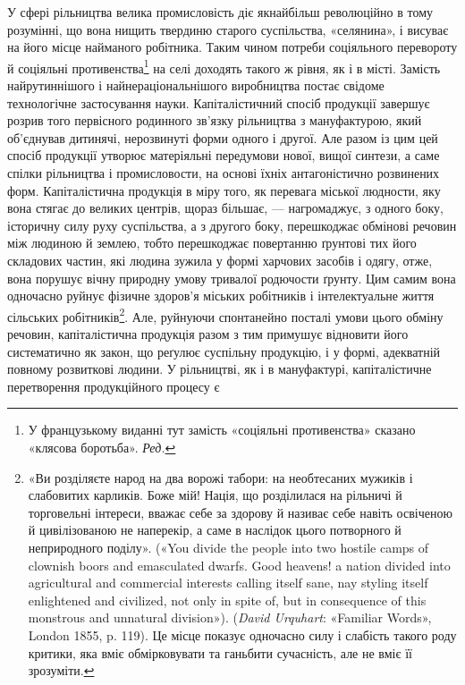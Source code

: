 У сфері рільництва велика промисловість діє якнайбільш
революційно в тому розумінні, що вона нищить твердиню старого
суспільства, «селянина», і висуває на його місце найманого робітника.
Таким чином потреби соціяльного перевороту й соціяльні
противенства\footnote*{
У французькому виданні тут замість «соціяльні противенства»
сказано «клясова боротьба». \emph{Ред.}
} на селі доходять такого ж рівня, як і в місті.
Замість найрутиннішого і найнераціональнішого виробництва
постає свідоме технологічне застосування науки. Капіталістичний
спосіб продукції завершує розрив того первісного родинного
зв’язку рільництва з мануфактурою, який об’єднував дитинячі,
нерозвинуті форми одного і другої. Але разом із цим цей спосіб
продукції утворює матеріяльні передумови нової, вищої
синтези, а саме спілки рільництва і промисловости, на основі
їхніх антагоністично розвинених форм. Капіталістична продукція
в міру того, як перевага міської людности, яку вона стягає до
великих центрів, щораз більшає, — нагромаджує, з одного боку,
історичну силу руху суспільства, а з другого боку, перешкоджає
обмінові речовин між людиною й землею, тобто перешкоджає
повертанню ґрунтові тих його складових частин, які людина
зужила у формі харчових засобів і одягу, отже, вона порушує
вічну природну умову тривалої родючости ґрунту. Цим самим
вона одночасно руйнує фізичне здоров’я міських робітників і
інтелектуальне життя сільських робітників\footnote{
«Ви розділяєте народ на два ворожі табори: на необтесаних мужиків
і слабовитих карликів. Боже мій! Нація, що розділилася на рільничі
й торговельні інтереси, вважає себе за здорову й називає себе
навіть освіченою й цивілізованою не наперекір, а саме в наслідок цього
потворного й неприродного поділу». («You divide the people into two
hostile camps of clownish boors and emasculated dwarfs. Good heavens!
a nation divided into agricultural and commercial interests calling itself
sane, nay styling itself enlightened and civilized, not only in spite of,
but in consequence of this monstrous and unnatural division»). (\emph{David
Urquhart}: «Familiar Words», London 1855, p. 119). Це місце показує
одночасно силу і слабість такого роду критики, яка вміє обмірковувати
та ганьбити сучасність, але не вміє її зрозуміти.
}.  Але, руйнуючи
спонтанейно посталі умови цього обміну речовин, капіталістична
продукція разом з тим примушує відновити його систематично
як закон, що реґулює суспільну продукцію, і у формі, адекватній
повному розвиткові людини. У рільництві, як і в мануфактурі,
капіталістичне перетворення продукційного процесу є
